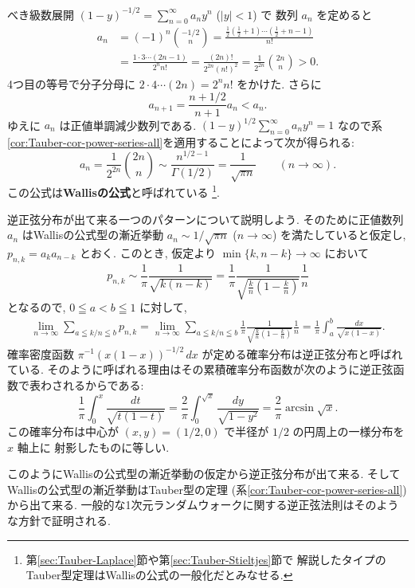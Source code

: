 \documentclass[12pt,twoside]{jarticle}
\theoremstyle{jplain}
\theoremstyle{jplain}
\theoremstyle{jplain}
\numberwithin{theorem}{section}
\numberwithin{equation}{section}
\numberwithin{figure}{section}
\numberwithin{table}{section}
\newcommand\secref[1]{第\ref{#1}節}
\newcommand\corref[1]{系\ref{#1}}
\begin{document}
べき級数展開 $(1-y)^{-1/2}=\sum_{n=0}^\infty a_n y^n$ ($|y|<1$) で
数列 $a_n$ を定めると
\begin{align*}
a_n
&
=(-1)^n\binom{-1/2}{n}
=\frac{\frac{1}{2}(\frac{1}{2}+1)\cdots(\frac{1}{2}+n-1)}{n!}
\\ &
=\frac{1\cdot 3\cdots(2n-1)}{2^n n!}
=\frac{(2n)!}{2^{2n}(n!)^2}
=\frac{1}{2^{2n}}\binom{2n}{n}>0.
\end{align*}
4つ目の等号で分子分母に $2\cdot 4\cdots(2n)=2^n n!$ をかけた.
さらに
\[
a_{n+1}=\frac{n+1/2}{n+1}a_n<a_n.
\]
ゆえに $a_n$ は正値単調減少数列である.
$(1-y)^{1/2}\sum_{n=0}^\infty a_n y^n=1$
なので\corref{cor:Tauber-cor-power-series-all}を適用することによって次が得られる:
\[
a_n=\frac{1}{2^{2n}}\binom{2n}{n}
\sim \frac{n^{1/2-1}}{\Gamma(1/2)}
=\frac{1}{\sqrt{\pi n}}
\qquad (n\to\infty).
\]
この公式は{\bfseries Wallisの公式}と呼ばれている%
\footnote{\secref{sec:Tauber-Laplace}や\secref{sec:Tauber-Stieltjes}で
解説したタイプのTauber型定理はWallisの公式の一般化だとみなせる.}.

逆正弦分布が出て来る一つのパターンについて説明しよう.
そのために正値数列 $a_n$ はWallisの公式型の漸近挙動
$a_n\sim 1/\sqrt{\pi n}$ ($n\to\infty$) を満たしていると仮定し,
$p_{n,k}=a_k a_{n-k}$ とおく.
このとき, 仮定より $\min\{k,n-k\}\to\infty$ において
\[
p_{n,k} \sim \frac{1}{\pi}\frac{1}{\sqrt{k(n-k)}}
= \frac{1}{\pi}\frac{1}{\sqrt{\frac{k}{n}\left(1-\frac{k}{n}\right)}}\frac{1}{n}
\]
となるので, $0\leqq a<b\leqq1$ に対して,
\begin{align*}
\lim_{n\to\infty}
\sum_{a\leqq k/n\leqq b} p_{n,k}
=\lim_{n\to\infty}
\sum_{a\leqq k/n\leqq b}
\frac{1}{\pi}\frac{1}{\sqrt{\frac{k}{n}\left(1-\frac{k}{n}\right)}}\frac{1}{n}
=\frac{1}{\pi}\int_a^b\frac{dx}{\sqrt{x(1-x)}}.
\end{align*}
確率密度函数 $\pi^{-1}(x(1-x))^{-1/2}\,dx$ が定める確率分布は逆正弦分布と呼ばれている.
そのように呼ばれる理由はその累積確率分布函数が次のように逆正弦函数で表わされるからである:
\[
\frac{1}{\pi}\int_0^x \frac{dt}{\sqrt{t(1-t)}}
=\frac{2}{\pi}\int_0^{\sqrt{x}}\frac{dy}{\sqrt{1-y^2}}
= \frac{2}{\pi}\arcsin\sqrt{x}.
\]
この確率分布は中心が $(x,y)=(1/2,0)$ で半径が $1/2$ の円周上の一様分布を $x$ 軸上に
射影したものに等しい.

このようにWallisの公式型の漸近挙動の仮定から逆正弦分布が出て来る.
そしてWallisの公式型の漸近挙動はTauber型の定理
(\corref{cor:Tauber-cor-power-series-all})から出て来る.
一般的な1次元ランダムウォークに関する逆正弦法則はそのような方針で証明される.
\end{document}
